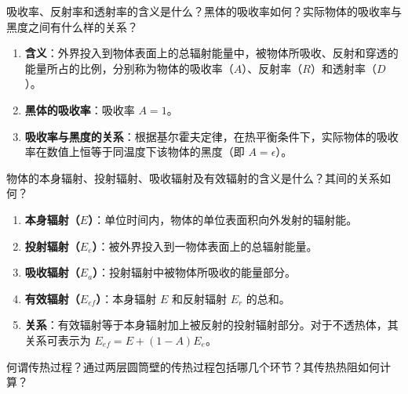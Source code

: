 \begin{problem}
吸收率、反射率和透射率的含义是什么？黑体的吸收率如何？实际物体的吸收率与黑度之间有什么样的关系？
\end{problem}

\begin{solution}
\begin{enumerate}
  \item \textbf{含义}：外界投入到物体表面上的总辐射能量中，被物体所吸收、反射和穿透的能量所占的比例，分别称为物体的吸收率（\(A\)）、反射率（\(R\)）和透射率（\(D\)）。
  \item \textbf{黑体的吸收率}：吸收率 \(A=1\)。
  \item \textbf{吸收率与黑度的关系}：根据基尔霍夫定律，在热平衡条件下，实际物体的吸收率在数值上恒等于同温度下该物体的黑度（即 \(A=\epsilon\)）。
\end{enumerate}
\end{solution}

\begin{problem}
物体的本身辐射、投射辐射、吸收辐射及有效辐射的含义是什么？其间的关系如何？
\end{problem}

\begin{solution}
\begin{enumerate}
  \item \textbf{本身辐射（\(E\)）}：单位时间内，物体的单位表面积向外发射的辐射能。
  \item \textbf{投射辐射（\(E_e\)）}：被外界投入到一物体表面上的总辐射能量。
  \item \textbf{吸收辐射（\(E_a\)）}：投射辐射中被物体所吸收的能量部分。
  \item \textbf{有效辐射（\(E_{ef}\)）}：本身辐射 \(E\) 和反射辐射 \(E_r\) 的总和。
  \item \textbf{关系}：有效辐射等于本身辐射加上被反射的投射辐射部分。对于不透热体，其关系可表示为 \(E_{ef}=E+(1-A)E_e\)。
\end{enumerate}
\end{solution}

\begin{problem}
何谓传热过程？通过两层圆筒壁的传热过程包括哪几个环节？其传热热阻如何计算？
\end{problem}

